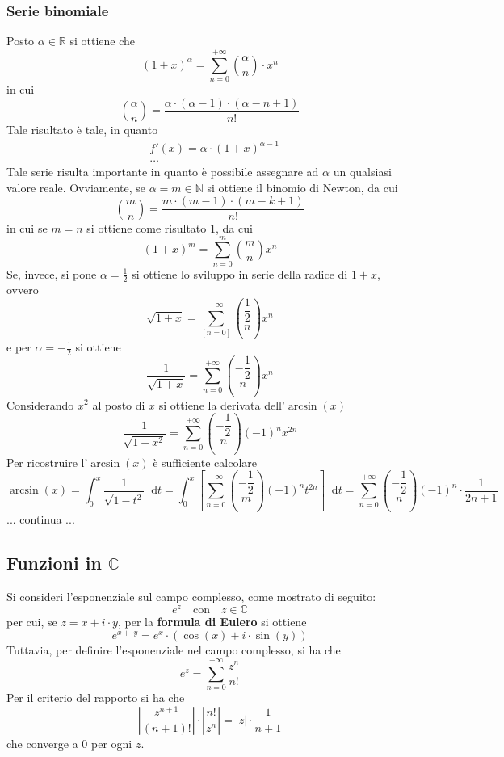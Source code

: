 \documentclass[a4paper]{extarticle}
\newcommand*\dif{\mathop{}\!\mathrm{d}}
\begin{document}
\subsubsection{Serie binomiale}
Posto $\alpha \in \mathbb{R}$ si ottiene che
\[(1+x)^\alpha = \sum_{n=0}^{+\infty} \binom{\alpha}{n} \cdot x^n\]
in cui
\[\binom{\alpha}{n} = \frac{\alpha \cdot (\alpha-1) \cdot (\alpha-n+1)}{n!}\]
Tale risultato è tale, in quanto
\begin{align}
    & f'(x) = \alpha \cdot (1+x)^{\alpha-1}\\
    & \dots
\end{align}
Tale serie risulta importante in quanto è possibile assegnare ad $\alpha$ un qualsiasi valore reale. Ovviamente, se $\alpha = m \in \mathbb{N}$ si ottiene il binomio di Newton, da cui
\[\binom{m}{n} = \frac{m \cdot (m-1) \cdot (m-k+1)}{n!}\]
in cui se $m=n$ si ottiene come risultato $1$, da cui
\[(1+x)^m = \sum_{n=0}^m \binom{m}{n} x^n\]
Se, invece, si pone $\alpha=\frac{1}{2}$ si ottiene lo sviluppo in serie della radice di $1+x$, ovvero
\[\sqrt{1+x}=\sum_[n=0]^{+\infty} \binom{\dfrac{1}{2}}{n} x^n\]
e per $\alpha=-\frac{1}{2}$ si ottiene
\[\frac{1}{\sqrt{1+x}} = \sum_{n=0}^{+\infty} \binom{-\dfrac{1}{2}}{n} x^n\]
Considerando $x^2$ al posto di $x$ si ottiene la derivata dell'$\arcsin(x)$
\[\frac{1}{\sqrt{1-x^2}} = \sum_{n=0}^{+\infty} \binom{-\dfrac{1}{2}}{n} (-1)^n x^{2n}\]
Per ricostruire l'$\arcsin(x)$ è sufficiente calcolare
\[\arcsin(x)=\int_0^x \frac{1}{\sqrt{1-t^2}} \dif t = \int_0^x \left[ \sum_{n=0}^{+\infty} \binom{-\dfrac{1}{2}}{m} (-1)^n t^{2n}\right] \dif t = \sum_{n=0}^{+\infty} \binom{-\dfrac{1}{2}}{n} (-1)^n \cdot \frac{1}{2n+1}\]
... continua ...

\vspace{1em}
\noindent
\subsection{Funzioni in $\mathbb{C}$}
Si consideri l'esponenziale sul campo complesso, come mostrato di seguito:
\[e^z \hspace{1em} \text{con} \hspace{1em} z \in \mathbb{C}\]
per cui, se $z=x+i \cdot y$, per la \textbf{formula di Eulero} si ottiene
\[e^{x+\cdot y} = e^x \cdot \left(\cos(x) + i \cdot \sin(y)\right)\]
Tuttavia, per definire l'esponenziale nel campo complesso, si ha che
\[e^z = \sum_{n=0}^{+\infty} \frac{z^n}{n!}\]
Per il criterio del rapporto si ha che
\[\left \vert \frac{z^{n+1}}{(n+1)!} \right \vert \cdot \left \vert \frac{n!}{z^n} \right \vert = \vert z \vert \cdot \frac{1}{n+1}\]
che converge a $0$ per ogni $z$.
\end{document}
